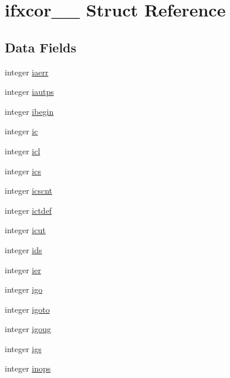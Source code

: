 \hypertarget{structifxcor__1__}{}\section{ifxcor\+\_\+\_\+ Struct Reference}
\label{structifxcor__1__}
\subsection*{Data Fields}
\begin{DoxyCompactItemize}
\item 
integer \hyperlink{structifxcor__1___a10cf50c21fed443860fc1c49b90b6541}{iaerr}
\item 
integer \hyperlink{structifxcor__1___ad9597f2ed7561bf2d151ac0f769c9b87}{iautps}
\item 
integer \hyperlink{structifxcor__1___aeb0a611272568daee5df6c3f4be219c5}{ibegin}
\item 
integer \hyperlink{structifxcor__1___abb5a5215673cd64d63023730dbf32045}{ic}
\item 
integer \hyperlink{structifxcor__1___a66b285e5ddc84c89154a1e7de7fdf68a}{icl}
\item 
integer \hyperlink{structifxcor__1___a18932df5ee9d2d401cc2856d18d75737}{ics}
\item 
integer \hyperlink{structifxcor__1___aa0f79c69e52037856ea612b421cd3818}{icscnt}
\item 
integer \hyperlink{structifxcor__1___abf3f6482f7eb96e4f944798e3668a6d2}{ictdef}
\item 
integer \hyperlink{structifxcor__1___aaccc47cde934a5eea1f2f589d1915ca1}{icut}
\item 
integer \hyperlink{structifxcor__1___a29924efc49d86bd8a881d6b27c8878e0}{ids}
\item 
integer \hyperlink{structifxcor__1___af93198bfd48971c8c1402770f58f97c0}{ier}
\item 
integer \hyperlink{structifxcor__1___aa1442bdb23b8ab2005f16ef22f23be88}{igo}
\item 
integer \hyperlink{structifxcor__1___a986a7bee681c8a4ac25665c6210c861d}{igoto}
\item 
integer \hyperlink{structifxcor__1___a3ff302df89aa521652d067ea158f3771}{igoug}
\item 
integer \hyperlink{structifxcor__1___a7b973c1daed8836a87a9fd5a8feb0332}{igs}
\item 
integer \hyperlink{structifxcor__1___a20efef9ee1b6f2addce40b98af97b692}{inops}
\item 

\end{DoxyCompactItemize}
